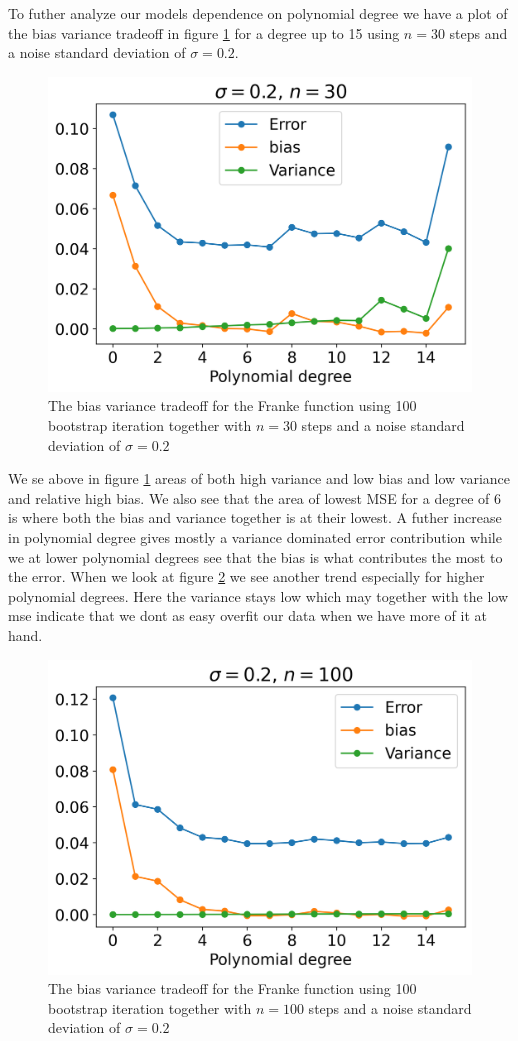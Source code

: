 \documentclass[12pt]{article}
\begin{document}
To futher analyze our models dependence on polynomial degree we have a plot of the bias variance tradeoff in figure \ref{fig:bias_variance} for a degree up to 15 using $n=30$ steps and a noise standard deviation of $\sigma=0.2$.
\begin{figure}[H]
  \centering
  \includegraphics[width=.7\textwidth]{../figures/bias_variance_tradeoff.png}
  \caption{The bias variance tradeoff for the Franke function using 100 bootstrap iteration together with $n=30$ steps and a noise standard deviation of $\sigma=0.2$}
  \label{fig:bias_variance}
\end{figure}
We se above in figure \ref{fig:bias_variance} areas of both high variance and low bias and low variance and relative high bias. We also see that the area of lowest MSE for a degree of 6 is where both the bias and variance together is at their lowest. A futher increase in polynomial degree gives mostly a variance dominated error contribution while we at lower polynomial degrees see that the bias is what contributes the most to the error. When we look at figure \ref{fig:bias_variance_100} we see another trend especially for higher polynomial degrees. Here the variance stays low which may together with the low mse indicate that we dont as easy overfit our data when we have more of it at hand.
\begin{figure}[H]
  \centering
  \includegraphics[width=.7\textwidth]{../figures/bias_variance_100.png}
  \caption{The bias variance tradeoff for the Franke function using 100 bootstrap iteration together with $n=100$ steps and a noise standard deviation of $\sigma=0.2$}
  \label{fig:bias_variance_100}
\end{figure}
\end{document}
